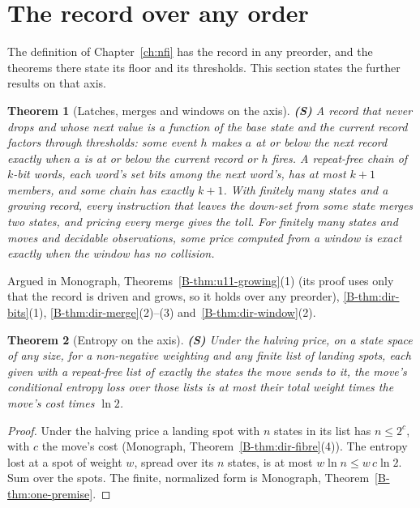 \documentclass[11pt, a4paper]{report}
\theoremstyle{definition}
\theoremstyle{plain}
\newtheorem{theorem}{Theorem}[chapter]
\begin{document}
\section{The record over any order}

The definition of Chapter~\ref{ch:nfi} has the record in any preorder, and the theorems there state its floor and its thresholds. This section states the further results on that axis.

\begin{theorem}[Latches, merges and windows on the axis] \textbf{(S)}
A record that never drops and whose next value is a function of the base state and the current record factors through thresholds: some event $h$ makes $a$ at or below the next record exactly when $a$ is at or below the current record or $h$ fires. A repeat-free chain of $k$-bit words, each word's set bits among the next word's, has at most $k + 1$ members, and some chain has exactly $k + 1$. With finitely many states and a growing record, every instruction that leaves the down-set from some state merges two states, and pricing every merge gives the toll. For finitely many states and moves and decidable observations, some price computed from a window is exact exactly when the window has no collision.
\end{theorem}
\noindent Argued in Monograph, Theorems~\ref{B-thm:u11-growing}(1) (its proof uses only that the
record is driven and grows, so it holds over any preorder), \ref{B-thm:dir-bits}(1),
\ref{B-thm:dir-merge}(2)--(3) and~\ref{B-thm:dir-window}(2).

\begin{theorem}[Entropy on the axis] \textbf{(S)}
Under the halving price, on a state space of any size, for a non-negative weighting and any finite list of landing spots, each given with a repeat-free list of exactly the states the move sends to it, the move's conditional entropy loss over those lists is at most their total weight times the move's cost times $\ln 2$.
\end{theorem}
\begin{proof}
Under the halving price a landing spot with $n$ states in its list has $n \le 2^{c}$, with $c$ the
move's cost (Monograph, Theorem~\ref{B-thm:dir-fibre}(4)). The entropy lost at a spot of weight $w$,
spread over its $n$ states, is at most $w \ln n \le w\, c \ln 2$. Sum over the spots. The finite,
normalized form is Monograph, Theorem~\ref{B-thm:one-premise}.
\end{proof}

\end{document}
